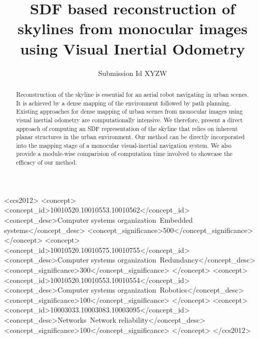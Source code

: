 \documentclass[sigconf, review=true]{acmart}
\begin{document}
\title{SDF based reconstruction of skylines from monocular images using Visual Inertial Odometry}

\author{Submission Id XYZW}


\renewcommand{\shortauthors}{}


\begin{abstract}
Reconstruction of the skyline is essential for an aerial robot navigating in urban scenes. It is achieved by a dense mapping of the environment followed by path planning.
Existing approaches for dense mapping of urban scenes from monocular images using visual inertial odometry are computationally intensive. 
We therefore, present a direct approach of computing an SDF representation of the skyline that relies on inherent planar structures in the urban environment. Our method can be directly incorporated into the mapping stage of a monocular visual-inertial navigation system. We also provide a module-wise comparision of computation time involved to showcase the efficacy of our method.
\end{abstract}

%
%
\begin{CCSXML}
<ccs2012>
 <concept>
  <concept_id>10010520.10010553.10010562</concept_id>
  <concept_desc>Computer systems organization~Embedded systems</concept_desc>
  <concept_significance>500</concept_significance>
 </concept>
 <concept>
  <concept_id>10010520.10010575.10010755</concept_id>
  <concept_desc>Computer systems organization~Redundancy</concept_desc>
  <concept_significance>300</concept_significance>
 </concept>
 <concept>
  <concept_id>10010520.10010553.10010554</concept_id>
  <concept_desc>Computer systems organization~Robotics</concept_desc>
  <concept_significance>100</concept_significance>
 </concept>
 <concept>
  <concept_id>10003033.10003083.10003095</concept_id>
  <concept_desc>Networks~Network reliability</concept_desc>
  <concept_significance>100</concept_significance>
 </concept>
</ccs2012>
\end{CCSXML}

\end{document}
